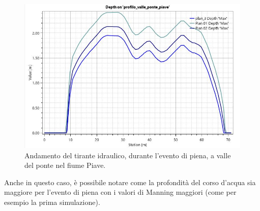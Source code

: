 \begin{figure}[H] \centering
    \includegraphics[scale=0.5]{immagini/depth_valle_ponte_piave.JPG}
    \caption{Andamento del tirante idraulico, durante l'evento di piena, a valle del ponte nel fiume Piave.}
    \label{figure:depth_valle_ponte_piave}
\end{figure}

Anche in questo caso, è possibile notare come la profondità del corso d'acqua sia maggiore per l'evento di piena con i valori di Manning maggiori (come per esempio la prima simulazione).

